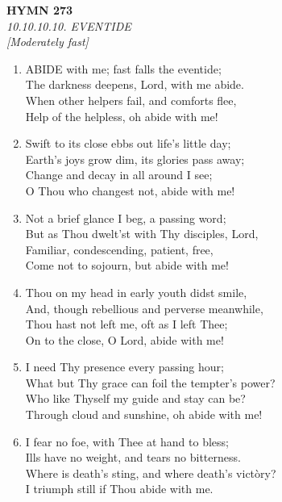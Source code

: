 \newpage
\begin{center}
    {\Large \textbf{HYMN 273}}
    \\
    \textit{10.10.10.10. EVENTIDE}
    \\
    \textit{\small [Moderately fast]}
\end{center}
\vspace{1em}

\begin{enumerate}
    \item ABIDE with me; fast falls the eventide; \\
        The darkness deepens, Lord, with me abide. \\
        When other helpers fail, and comforts flee, \\
        Help of the helpless, oh abide with me!

    \item Swift to its close ebbs out life's little day; \\
        Earth's joys grow dim, its glories pass away; \\
        Change and decay in all around I see; \\
        O Thou who changest not, abide with me!

    \item Not a brief glance I beg, a passing word; \\
        But as Thou dwelt'st with Thy disciples, Lord, \\
        Familiar, condescending, patient, free, \\
        Come not to sojourn, but abide with me!

    \item Thou on my head in early youth didst smile, \\
        And, though rebellious and perverse meanwhile, \\
        Thou hast not left me, oft as I left Thee; \\
        On to the close, O Lord, abide with me!

    \item I need Thy presence every passing hour; \\
        What but Thy grace can foil the tempter's power? \\
        Who like Thyself my guide and stay can be? \\
        Through cloud and sunshine, oh abide with me!

    \item I fear no foe, with Thee at hand to bless; \\
        Ills have no weight, and tears no bitterness. \\
        Where is death's sting, and where death's vict\`ory? \\
        I triumph still if Thou abide with me.


\end{enumerate}
